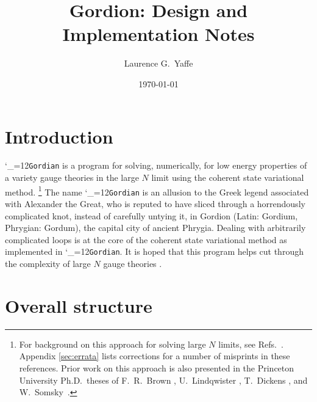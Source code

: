 \documentclass [12pt]{article}
\title
    {
    Gordion: Design and Implementation Notes
    \vspace*{-8pt}
    }
\date	{\small\today\vspace*{-30pt}}
\author	{Laurence G.~Yaffe}
\affil{%
    \small
    Department of Physics, University of Washington, Seattle WA 98195, USA
    \vspace*{-12pt}
    }%
\makeatletter
\renewcommand{\tt}{\begingroup\catcode`_=12\def\_{\string_}\tt@}
\newcommand{\tt@}[1]{\texttt{#1}\endgroup}
\makeatother
\begin{document}
\maketitle
\tableofcontents
\setlength{\parskip}{5pt plus 2pt minus 1pt}

\section {Introduction}

\tt{Gordian} is a program for solving, numerically,
for low energy properties of
a variety gauge theories in the large $N$ limit using the
coherent state variational method.%
\footnote
    {%
    For background on this approach for solving large $N$ limits,
    see Refs.~\cite{YaffeRMP, CSVAI, CSVAII,Yaffe:2026ouz}.
    Appendix \ref{sec:errata} lists corrections for
    a number of misprints in these references.
    Prior work on this approach is also presented
    in the Princeton University Ph.D.~theses
    of F.~R.~Brown \cite{Brown:1987km},
    U.~Lindqwister \cite {Lindqwister:1988xc},
    T.~Dickens \cite{Dickens:1987ih},
    and W.~Somsky~\cite{Somsky:1989}.
    }
The name \tt{Gordian} is an allusion to the Greek legend
associated with Alexander the Great, who
is reputed to have sliced through a horrendously complicated
knot, instead of carefully untying it,
in Gordion (Latin: Gordium, Phrygian: Gordum),
the capital city of ancient Phrygia.
Dealing with arbitrarily complicated loops is at the
core of the coherent state variational method as
implemented in \tt{Gordian}.
It is hoped that this program helps cut through
the complexity of large $N$ gauge theories
{\large\smiley{}}.

\setlength{\parskip}{3pt}

\section {Overall structure}
\end{document}

